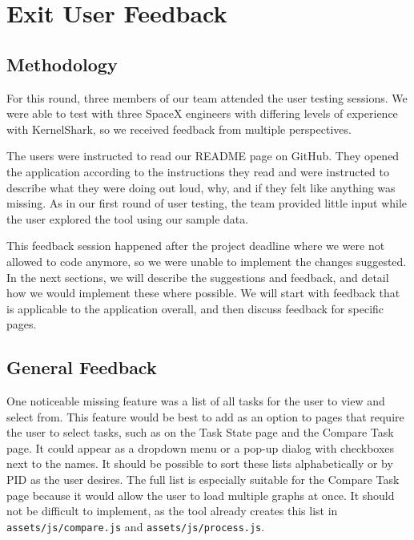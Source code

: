 \documentclass{hmcclinic}
\begin{document}
\chapter{Exit User Feedback}
\section{Methodology}
   For this round, three members of our team attended the user testing sessions.
   We were able to test with three SpaceX engineers with differing levels of
   experience with KernelShark, so we received feedback from multiple perspectives.

   The users were instructed to read our README page on GitHub. They
   opened the application according to the instructions they read and were
   instructed to describe what they were doing out loud, why, and if they felt
   like anything was missing. As in our first round of user testing, the team
   provided little input while the user explored the tool using our sample data.

   This feedback session happened after the project deadline where we were not allowed to code anymore, so we were unable to
   implement the changes suggested. In the next sections, we will describe the
   suggestions and feedback, and detail how we would implement these where
   possible. We will start with feedback that is applicable to the application
   overall, and then discuss feedback for specific pages.

\section{General Feedback}

One noticeable missing feature was a list of all tasks for the user to view and select from. 
This feature would be best to add as an option to pages that require the user to select tasks, such 
as on the Task State page and the Compare Task page. It could appear as a dropdown menu or a 
pop-up dialog with checkboxes next to the names. It should be possible to sort these lists 
alphabetically or by PID as the user desires. The full list is especially suitable for the 
Compare Task page because it would allow the user to load multiple graphs at once. It should 
not be difficult to implement, as the tool already creates this list in 
\texttt{assets/js/compare.js} and \texttt{assets/js/process.js}.
\end{document}
